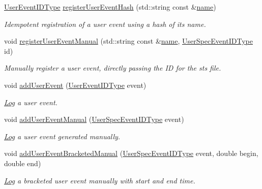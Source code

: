 \begin{DoxyCompactItemize}
\hyperlink{namespacevt_1_1trace_a5908920d051c144c89f17c69ed262350}{User\+Event\+I\+D\+Type} \hyperlink{structvt_1_1trace_1_1_trace_a1b80a8ca6bebbfbe61f8b119342e14f7}{register\+User\+Event\+Hash} (std\+::string const \&\hyperlink{structvt_1_1trace_1_1_trace_aaae4bbf6d009229a5c8b9db67a127942}{name})
\begin{DoxyCompactList}\small\item\em Idempotent registration of a user event using a hash of its name. \end{DoxyCompactList}\item 
void \hyperlink{structvt_1_1trace_1_1_trace_ade8d39718f60924f1aeb178ccda56cbc}{register\+User\+Event\+Manual} (std\+::string const \&\hyperlink{structvt_1_1trace_1_1_trace_aaae4bbf6d009229a5c8b9db67a127942}{name}, \hyperlink{namespacevt_1_1trace_a70c43e0e1596eea236912d4197d3120a}{User\+Spec\+Event\+I\+D\+Type} id)
\begin{DoxyCompactList}\small\item\em Manually register a user event, directly passing the ID for the sts file. \end{DoxyCompactList}\item 
void \hyperlink{structvt_1_1trace_1_1_trace_a0a4bbdf7bd3c2b8742cbceb24389a4c0}{add\+User\+Event} (\hyperlink{namespacevt_1_1trace_a5908920d051c144c89f17c69ed262350}{User\+Event\+I\+D\+Type} event)
\begin{DoxyCompactList}\small\item\em \hyperlink{structvt_1_1trace_1_1_log}{Log} a user event. \end{DoxyCompactList}\item 
void \hyperlink{structvt_1_1trace_1_1_trace_a2d9fac6bd71ba67e4f87b7efd7c6c6c7}{add\+User\+Event\+Manual} (\hyperlink{namespacevt_1_1trace_a70c43e0e1596eea236912d4197d3120a}{User\+Spec\+Event\+I\+D\+Type} event)
\begin{DoxyCompactList}\small\item\em \hyperlink{structvt_1_1trace_1_1_log}{Log} a user event generated manually. \end{DoxyCompactList}\item 
void \hyperlink{structvt_1_1trace_1_1_trace_ab0dd676ca3870682b0c52669d3603c11}{add\+User\+Event\+Bracketed\+Manual} (\hyperlink{namespacevt_1_1trace_a70c43e0e1596eea236912d4197d3120a}{User\+Spec\+Event\+I\+D\+Type} event, double begin, double end)
\begin{DoxyCompactList}\small\item\em \hyperlink{structvt_1_1trace_1_1_log}{Log} a bracketed user event manually with start and end time. \end{DoxyCompactList}\item 

\end{DoxyCompactItemize}
